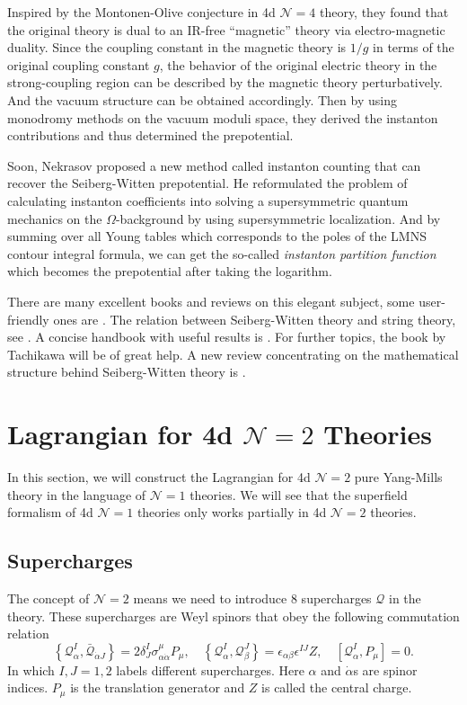 \documentclass{article}
\begin{document}
Inspired by the Montonen-Olive conjecture in 4d $\mathcal{N}=4$ theory, they found that the original theory is dual to an IR-free ``magnetic'' theory via electro-magnetic duality. Since the coupling constant in the magnetic theory is $1/g$ in terms of the original coupling constant $g$, the behavior of the original electric theory in the strong-coupling region can be described by the magnetic theory perturbatively. And the vacuum structure can be obtained accordingly. Then by using monodromy methods on the vacuum moduli space, they derived the instanton contributions and thus determined the prepotential.

Soon, Nekrasov proposed a new method called instanton counting that can recover the Seiberg-Witten prepotential. He reformulated the problem of calculating instanton coefficients into solving a supersymmetric quantum mechanics on the $\Omega$-background by using supersymmetric localization. And by summing over all Young tables which corresponds to the poles of the LMNS contour integral formula, we can get the so-called \emph{instanton partition function} which becomes the prepotential after taking the logarithm. 

There are many excellent books and reviews on this elegant subject, some user-friendly ones are \cite{Alv97,Pes97,Arg00}. The relation between Seiberg-Witten theory and string theory, see \cite{Ler97}. A concise handbook with useful results is \cite{Ter05}. For further topics, the book by Tachikawa \cite{Tac15} will be of great help. A new review concentrating on the mathematical structure behind Seiberg-Witten theory is \cite{Mar20}.

\section{Lagrangian for 4d $\mathcal{N}=2$ Theories}
In this section, we will construct the Lagrangian for 4d $\mathcal{N}=2$ pure Yang-Mills theory in the language of $\mathcal{N}=1$ theories. We will see that the superfield formalism of 4d $\mathcal{N}=1$ theories only works partially in 4d $\mathcal{N}=2$ theories.

\subsection{Supercharges}
The concept of $\mathcal{N}=2$ means we need to introduce $8$ supercharges $\mathcal{Q}$ in the theory. These supercharges are Weyl spinors that obey the following commutation relation
\begin{equation}
\left\{\mathcal{Q}_{\alpha}^{I}, \bar{\mathcal{Q}}_{\dot{\alpha} J}\right\}=2 \delta_{J}^{I} \sigma_{\alpha \dot{\alpha}}^{\mu} P_{\mu}, \quad\left\{\mathcal{Q}_{\alpha}^{I}, \mathcal{Q}_{\beta}^{J}\right\}=\epsilon_{\alpha \beta} \epsilon^{I J} Z, \quad\left[\mathcal{Q}_{\alpha}^{I}, P_{\mu}\right]=0. 
\end{equation}
In which $I,J=1,2$ labels different supercharges. Here $\alpha$ and $\dot{\alpha}$s are spinor indices. $P_{\mu}$ is the translation generator and $Z$ is called the central charge. 
\end{document}
